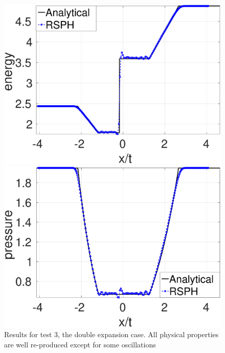 \begin{figure}
\begin{minipage}{.415\textwidth}
        \includegraphics[width=0.99 \textwidth]{./Chapter-4/Figures/double_exp/Dexp-RCM-e}
    \end{minipage}%
    \begin{minipage}{.415 \textwidth}
        \centering
        \includegraphics[width=0.99 \textwidth]{./Chapter-4/Figures/double_exp/Dexp-RCM-p}
    \end{minipage}%
    \caption{Results for test 3, the double expansion case. All physical properties are well re-produced except for some oscillations}
    \label{fig:RCM-double-expansion}
\end{figure}

